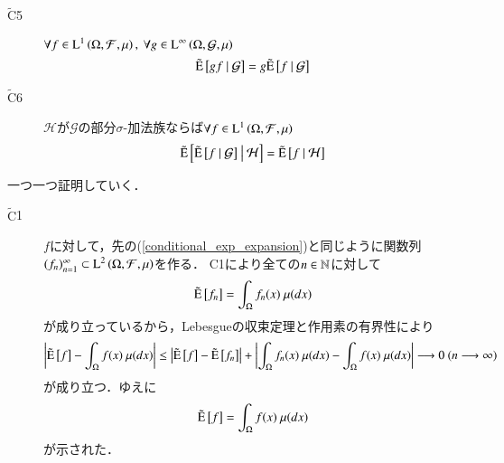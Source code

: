 \begin{prf}
\begin{description}
			\item[$\tilde{\mathrm{C}}$5]	$\forall f \in \operatorname{L}^{1} \left(\Omega, \mathcal{F},\mu\right),\ \forall g \in \operatorname{L}^{\infty} \left(\Omega, \mathcal{G},\mu\right)$
				\begin{align}
					\tilde{\operatorname{E}} \left[ gf \ \middle|\ \mathcal{G} \right] = g\tilde{\operatorname{E}} \left[ f \ \middle|\ \mathcal{G} \right]
				\end{align}
			
			\item[$\tilde{\mathrm{C}}$6]	$\mathcal{H}$が$\mathcal{G}$の部分$\sigma$-加法族ならば$\forall f \in \operatorname{L}^{1} \left(\Omega, \mathcal{F},\mu\right)$
				\begin{align}
					\tilde{\operatorname{E}} \left[ \tilde{\operatorname{E}} \left[ f \ \middle|\ \mathcal{G} \right] \ \middle|\ \mathcal{H} \right] = \tilde{\operatorname{E}} \left[ f \ \middle|\ \mathcal{H} \right]
				\end{align}
		\end{description}
		一つ一つ証明していく．
		\begin{description}
			\item[$\tilde{\mathrm{C}}$1]
				$f$に対して，先の(\ref{conditional_exp_expansion})と同じように関数列$(f_n)_{n=1}^{\infty} \subset \operatorname{L}^{2} \left(\Omega,\mathcal{F},\mu\right)$を作る．
				C1により全ての$n \in \mathbb{N}$に対して
				\begin{align}
					\tilde{\operatorname{E}} \left[ f_n \right] = \int_{\Omega} f_n(x)\ \mu(dx)
				\end{align}
				が成り立っているから，Lebesgueの収束定理と作用素の有界性により
				\begin{align}
					\left| \tilde{\operatorname{E}} \left[ f \right] - \int_{\Omega} f(x)\ \mu(dx) \right|
					\leq \left| \tilde{\operatorname{E}} \left[ f \right] - \tilde{\operatorname{E}} \left[ f_n \right] \right| + \left| \int_{\Omega} f_n(x)\ \mu(dx) - \int_{\Omega} f(x)\ \mu(dx) \right|
					\longrightarrow 0\ (n \longrightarrow \infty)
				\end{align}
				が成り立つ．ゆえに
				\begin{align}
					\tilde{\operatorname{E}} \left[ f \right] = \int_{\Omega} f(x)\ \mu(dx)
				\end{align}
				が示された．
				

\end{description}
\end{prf}
